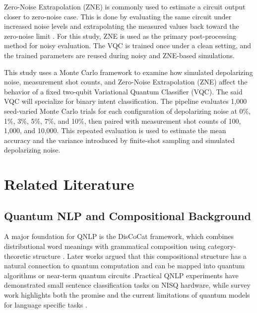 \documentclass[conference]{IEEEtran}
\begin{document}
Zero-Noise Extrapolation (ZNE) is commonly
used to estimate a circuit output closer to zero-noise case. This is done by evaluating
the same circuit under increased noise levels and extrapolating the measured
values back toward the zero-noise limit \cite{b_koenig2024, b_mohammadipour2025}. 
For this study, ZNE is used as the primary
post-processing method for noisy evaluation. The VQC is trained once under a
clean setting, and the trained parameters are reused during noisy and
ZNE-based simulations.

This study uses a Monte Carlo framework to examine how simulated
depolarizing noise, measurement shot counts, and Zero-Noise Extrapolation (ZNE)
affect the behavior of a fixed two-qubit Variational Quantum Classifier (VQC).
The said VQC will specialize for binary intent classification. The pipeline evaluates 1{,}000 seed-varied
Monte Carlo trials for each configuration of depolarizing noise at 0\%, 1\%,
3\%, 5\%, 7\%, and 10\%, then paired with measurement shot counts of 100,
1{,}000, and 10{,}000. This repeated evaluation is used to estimate the mean
accuracy and the variance introduced by finite-shot sampling and simulated
depolarizing noise.

\section{Related Literature}
\label{sec:related_literature}

\subsection{Quantum NLP and Compositional Background}

A major foundation for QNLP is the DisCoCat framework, which
combines distributional word meanings with grammatical composition using
category-theoretic structure \cite{b_coeckesadrzadeh2010}. Later works argued
that this compositional structure has a natural connection to quantum
computation and can be mapped into quantum algorithms or near-term quantum
circuits \cite{b_zengcoecke2016, b_coecke2020}.Practical QNLP experiments
have demonstrated small sentence classification tasks on NISQ hardware, while
survey work highlights both the promise and the current limitations of quantum
models for language specific tasks \cite{b_lorenz2023, b_guarasci2022, b_phukan2025}.
\end{document}
